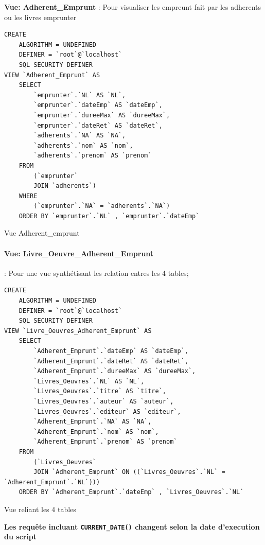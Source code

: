 \documentclass{article}
\begin{document}
\textbf{Vue: Adherent\_Emprunt} : Pour visualiser les empreunt fait par les adherents ou les livres emprunter
\begin{listing}[H]
\begin{verbatim}
CREATE 
    ALGORITHM = UNDEFINED 
    DEFINER = `root`@`localhost` 
    SQL SECURITY DEFINER
VIEW `Adherent_Emprunt` AS
    SELECT 
        `emprunter`.`NL` AS `NL`,
        `emprunter`.`dateEmp` AS `dateEmp`,
        `emprunter`.`dureeMax` AS `dureeMax`,
        `emprunter`.`dateRet` AS `dateRet`,
        `adherents`.`NA` AS `NA`,
        `adherents`.`nom` AS `nom`,
        `adherents`.`prenom` AS `prenom`
    FROM
        (`emprunter`
        JOIN `adherents`)
    WHERE
        (`emprunter`.`NA` = `adherents`.`NA`)
    ORDER BY `emprunter`.`NL` , `emprunter`.`dateEmp`
\end{verbatim}
	\caption{Vue Adherent\_emprunt}
\end{listing}

\newpage
\paragraph{Vue: Livre\_Oeuvre\_Adherent\_Emprunt }: Pour une vue synthétisant les relation entres les 4  tables;
\begin{listing}[H]
\begin{verbatim}
CREATE 
	ALGORITHM = UNDEFINED 
	DEFINER = `root`@`localhost` 
	SQL SECURITY DEFINER
VIEW `Livre_Oeuvres_Adherent_Emprunt` AS
	SELECT 
		`Adherent_Emprunt`.`dateEmp` AS `dateEmp`,
		`Adherent_Emprunt`.`dateRet` AS `dateRet`,
		`Adherent_Emprunt`.`dureeMax` AS `dureeMax`,
		`Livres_Oeuvres`.`NL` AS `NL`,
		`Livres_Oeuvres`.`titre` AS `titre`,
		`Livres_Oeuvres`.`auteur` AS `auteur`,
		`Livres_Oeuvres`.`editeur` AS `editeur`,
		`Adherent_Emprunt`.`NA` AS `NA`,
		`Adherent_Emprunt`.`nom` AS `nom`,
		`Adherent_Emprunt`.`prenom` AS `prenom`
	FROM
		(`Livres_Oeuvres`
		JOIN `Adherent_Emprunt` ON ((`Livres_Oeuvres`.`NL` = `Adherent_Emprunt`.`NL`)))
	ORDER BY `Adherent_Emprunt`.`dateEmp` , `Livres_Oeuvres`.`NL`
\end{verbatim}
	\caption{Vue reliant les 4 tables}
\end{listing}

\textbf{\large Les requête incluant \texttt{CURRENT_DATE()} changent selon la date d'execution du script}
\end{document}
